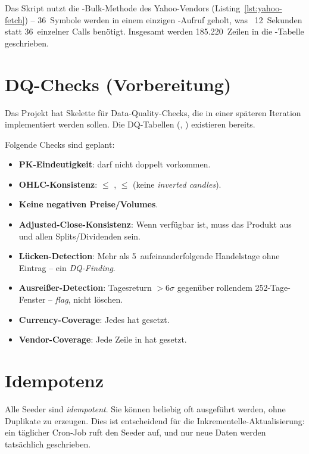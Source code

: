 Das Skript nutzt die -Bulk-Methode des
Yahoo-Vendors (Listing~\ref{lst:yahoo-fetch}) -- 36~Symbole
werden in einem einzigen -Aufruf geholt, was
~12~Sekunden statt 36~einzelner Calls benötigt. Insgesamt
werden 185.220~Zeilen in die -Tabelle
geschrieben.

\section{DQ-Checks (Vorbereitung)}

Das Projekt hat Skelette für Data-Quality-Checks, die in einer
späteren Iteration implementiert werden sollen. Die
DQ-Tabellen (, ) existieren bereits.

Folgende Checks sind geplant:

\begin{itemize}
  \item \textbf{PK-Eindeutigkeit}: 
        darf nicht doppelt vorkommen.
  \item \textbf{OHLC-Konsistenz}:  $\leq$ , 
        $\leq$  (keine \emph{inverted candles}).
  \item \textbf{Keine negativen Preise/Volumes}.
  \item \textbf{Adjusted-Close-Konsistenz}: Wenn 
        verfügbar ist, muss  das Produkt aus
         und allen Splits/Dividenden sein.
  \item \textbf{Lücken-Detection}: Mehr als 5~aufeinanderfolgende
        Handelstage ohne Eintrag -- ein \emph{DQ-Finding}.
  \item \textbf{Ausreißer-Detection}: Tagesreturn $> 6\sigma$
        gegenüber rollendem 252-Tage-Fenster -- \emph{flag}, nicht
        löschen.
  \item \textbf{Currency-Coverage}: Jedes  hat
         gesetzt.
  \item \textbf{Vendor-Coverage}: Jede Zeile in 
        hat  gesetzt.
\end{itemize}

\section{Idempotenz}

\begin{merke}
Alle Seeder sind \emph{idempotent}. Sie können beliebig oft
ausgeführt werden, ohne Duplikate zu erzeugen. Dies ist entscheidend
für die Inkrementelle-Aktualisierung: ein täglicher Cron-Job ruft
den Seeder auf, und nur neue Daten werden tatsächlich geschrieben.
\end{merke}

